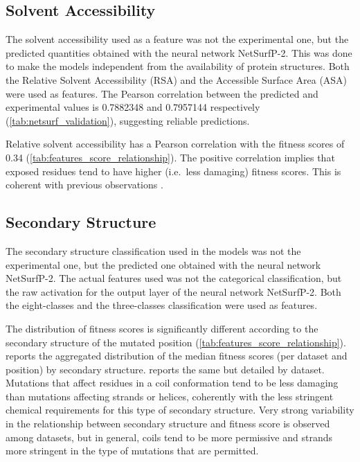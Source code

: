 \subsection{Solvent Accessibility}
The solvent accessibility used as a feature was not the experimental one, but the predicted quantities obtained with the neural network NetSurfP-2.
This was done to make the models independent from the availability of protein structures.
Both the Relative Solvent Accessibility (RSA) and the Accessible Surface Area (ASA) were used as features.
The Pearson correlation between the predicted and experimental values is \num{0.7882348} and \num{0.7957144} respectively (\cref{tab:netsurf_validation}), suggesting reliable predictions.

Relative solvent accessibility has a Pearson correlation with the fitness scores of \num{0.34} (\cref{tab:features_score_relationship}).
The positive correlation implies that exposed residues tend to have higher (i.e.\ less damaging) fitness scores.
This is coherent with previous observations \parencite{Savojardo2021}.

\subsection{Secondary Structure}
The secondary structure classification used in the models was not the experimental one, but the predicted one obtained with the neural network NetSurfP-2.
The actual features used was not the categorical classification, but the raw activation for the output layer of the neural network NetSurfP-2.
Both the eight-classes and the three-classes classification were used as features.

The distribution of fitness scores is significantly different according to the secondary structure of the mutated position (\cref{tab:features_score_relationship}).
 reports the aggregated distribution of the median fitness scores (per dataset and position) by secondary structure.
 reports the same but detailed by dataset.
Mutations that affect residues in a coil conformation tend to be less damaging than mutations affecting strands or helices, coherently with the less stringent chemical requirements for this type of secondary structure.
Very strong variability in the relationship between secondary structure and fitness score is observed among datasets, but in general, coils tend to be more permissive and strands more stringent in the type of mutations that are permitted.

